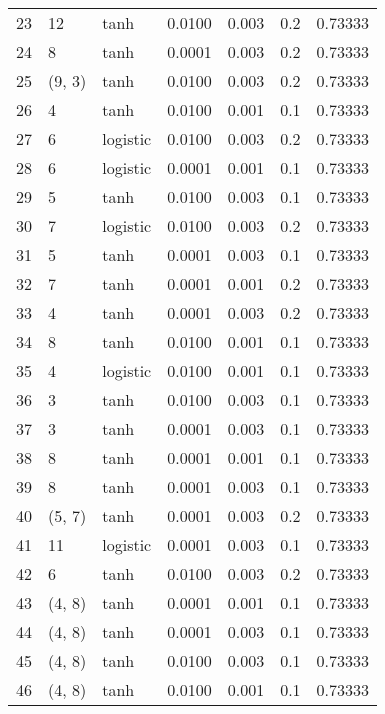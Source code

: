 \begin{tabular}{lllrrrr}
23  &          12 &      tanh &  0.0100 &  0.003 &  0.2 &   0.73333 \\
24  &           8 &      tanh &  0.0001 &  0.003 &  0.2 &   0.73333 \\
25  &      (9, 3) &      tanh &  0.0100 &  0.003 &  0.2 &   0.73333 \\
26  &           4 &      tanh &  0.0100 &  0.001 &  0.1 &   0.73333 \\
27  &           6 &  logistic &  0.0100 &  0.003 &  0.2 &   0.73333 \\
28  &           6 &  logistic &  0.0001 &  0.001 &  0.1 &   0.73333 \\
29  &           5 &      tanh &  0.0100 &  0.003 &  0.1 &   0.73333 \\
30  &           7 &  logistic &  0.0100 &  0.003 &  0.2 &   0.73333 \\
31  &           5 &      tanh &  0.0001 &  0.003 &  0.1 &   0.73333 \\
32  &           7 &      tanh &  0.0001 &  0.001 &  0.2 &   0.73333 \\
33  &           4 &      tanh &  0.0001 &  0.003 &  0.2 &   0.73333 \\
34  &           8 &      tanh &  0.0100 &  0.001 &  0.1 &   0.73333 \\
35  &           4 &  logistic &  0.0100 &  0.001 &  0.1 &   0.73333 \\
36  &           3 &      tanh &  0.0100 &  0.003 &  0.1 &   0.73333 \\
37  &           3 &      tanh &  0.0001 &  0.003 &  0.1 &   0.73333 \\
38  &           8 &      tanh &  0.0001 &  0.001 &  0.1 &   0.73333 \\
39  &           8 &      tanh &  0.0001 &  0.003 &  0.1 &   0.73333 \\
40  &      (5, 7) &      tanh &  0.0001 &  0.003 &  0.2 &   0.73333 \\
41  &          11 &  logistic &  0.0001 &  0.003 &  0.1 &   0.73333 \\
42  &           6 &      tanh &  0.0100 &  0.003 &  0.2 &   0.73333 \\
43  &      (4, 8) &      tanh &  0.0001 &  0.001 &  0.1 &   0.73333 \\
44  &      (4, 8) &      tanh &  0.0001 &  0.003 &  0.1 &   0.73333 \\
45  &      (4, 8) &      tanh &  0.0100 &  0.003 &  0.1 &   0.73333 \\
46  &      (4, 8) &      tanh &  0.0100 &  0.001 &  0.1 &   0.73333 \\

\end{tabular}
